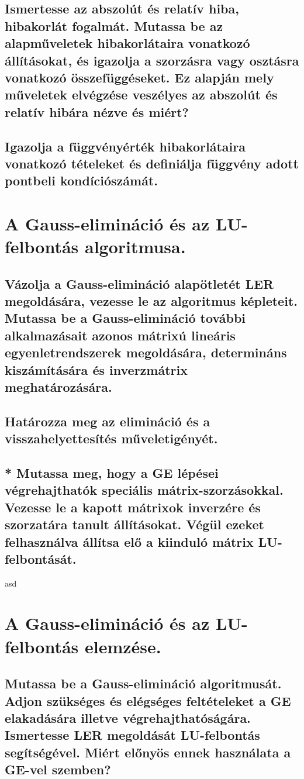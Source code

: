 \documentclass{article}
\begin{document}
        \subsection{Ismertesse az abszolút és relatív hiba, hibakorlát fogalmát. Mutassa be az alapműveletek hibakorlátaira vonatkozó állításokat, és igazolja a szorzásra vagy osztásra vonatkozó összefüggéseket. Ez alapján mely műveletek elvégzése veszélyes az abszolút és relatív hibára nézve és miért?}
        \subsection{Igazolja a függvényérték hibakorlátaira vonatkozó tételeket és definiálja függvény adott pontbeli kondíciószámát.}


    \section{A Gauss-elimináció és az LU-felbontás algoritmusa.}
        \subsection{Vázolja a Gauss-elimináció alapötletét LER megoldására, vezesse le az algoritmus képleteit. Mutassa be a Gauss-elimináció további alkalmazásait azonos mátrixú lineáris egyenletrendszerek megoldására, determináns kiszámítására és inverzmátrix meghatározására.}
        \subsection{Határozza meg az elimináció és a visszahelyettesítés műveletigényét.}
        \subsection{* Mutassa meg, hogy a GE lépései végrehajthatók speciális mátrix-szorzásokkal. Vezesse le a kapott mátrixok inverzére és szorzatára tanult állításokat. Végül ezeket felhasználva állítsa elő a kiinduló mátrix LU-felbontását.}
asd

    \section{A Gauss-elimináció és az LU-felbontás elemzése.}
        \subsection{Mutassa be a Gauss-elimináció algoritmusát. Adjon szükséges és elégséges feltételeket a GE elakadására illetve végrehajthatóságára. Ismertesse LER megoldását LU-felbontás segítségével. Miért előnyös ennek használata a GE-vel szemben?}
\end{document}
